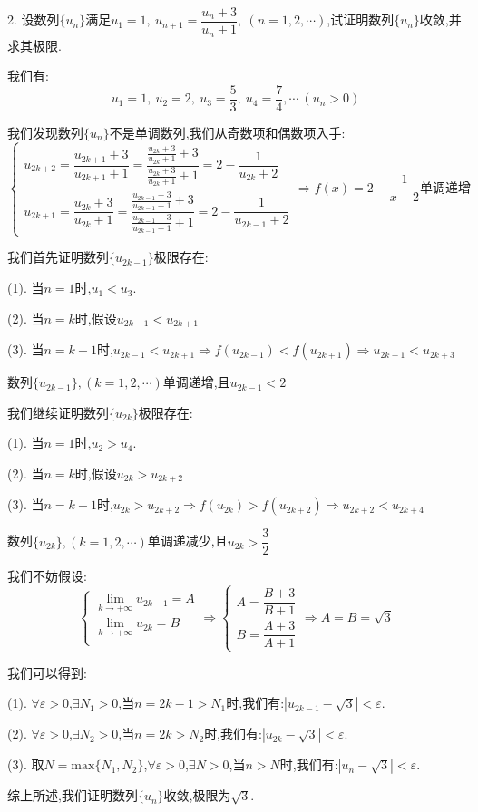 2. 设数列$\{u_{n}\}$满足$u_{1}=1,\ u_{n+1}=\dfrac{u_{n}+3}{u_{n}+1},\ (n=1,2,\cdots)$,试证明数列$\{u_{n}\}$收敛,并求其极限.
\begin{solution}

	我们有:
	$$u_{1}=1,\ u_{2}=2,\ u_{3}=\dfrac{5}{3},\ u_{4}=\dfrac{7}{4},\cdots\ (u_{n}>0)$$
	
	我们发现数列$\{u_{n}\}$不是单调数列,我们从奇数项和偶数项入手:
	$$\left\lbrace
	\begin{array}{l}
		u_{2k+2}=\dfrac{u_{2k+1}+3}{u_{2k+1}+1}=\dfrac{\frac{u_{2k}+3}{u_{2k}+1}+3}{\frac{u_{2k}+3}{u_{2k}+1}+1}=2-\dfrac{1}{u_{2k}+2}\\
		u_{2k+1}=\dfrac{u_{2k}+3}{u_{2k}+1}=\dfrac{\frac{u_{2k-1}+3}{u_{2k-1}+1}+3}{\frac{u_{2k-1}+3}{u_{2k-1}+1}+1}=2-\dfrac{1}{u_{2k-1}+2}
	\end{array}
	\right. \Rightarrow f(x)=2-\dfrac{1}{x+2}\text{单调递增}$$
	
	我们首先证明数列$\{u_{2k-1}\}$极限存在:  
	
	(1). 当$n=1$时,$u_{1}<u_{3}$.
	
	(2). 当$n=k$时,假设$u_{2k-1}<u_{2k+1}$
	
	(3). 当$n=k+1$时,$u_{2k-1}<u_{2k+1}\Rightarrow f(u_{2k-1})<f(u_{2k+1})\Rightarrow u_{2k+1}<u_{2k+3}$
	
	数列$\{u_{2k-1}\},(k=1,2,\cdots)$单调递增,且$u_{2k-1}<2$
	
	我们继续证明数列$\{u_{2k}\}$极限存在:  
	
	(1). 当$n=1$时,$u_{2}>u_{4}$.
	
	(2). 当$n=k$时,假设$u_{2k}>u_{2k+2}$
	
	(3). 当$n=k+1$时,$u_{2k}>u_{2k+2}\Rightarrow f(u_{2k})>f(u_{2k+2})\Rightarrow u_{2k+2}<u_{2k+4}$
	
	数列$\{u_{2k}\},(k=1,2,\cdots)$单调递减少,且$u_{2k}>\dfrac{3}{2}$
	
	我们不妨假设:  $$\left\lbrace
	\begin{array}{l}
		\lim\limits_{k\rightarrow +\infty}u_{2k-1}=A\\
		\lim\limits_{k\rightarrow +\infty}u_{2k}=B\\
	\end{array}
	\right. \Rightarrow \left\lbrace
	\begin{array}{l}
		A=\dfrac{B+3}{B+1}\\
		B=\dfrac{A+3}{A+1}
	\end{array}
	\right. \Rightarrow A=B=\sqrt{3}$$
	
	我们可以得到:  
	
	(1). $\forall \varepsilon>0$,$\exists N_{1}>0$,当$n=2k-1>N_{1}$时,我们有:$|u_{2k-1}-\sqrt{3}|<\varepsilon$.
	
	(2). $\forall \varepsilon>0$,$\exists N_{2}>0$,当$n=2k>N_{2}$时,我们有:$|u_{2k}-\sqrt{3}|<\varepsilon$.
	
	(3). 取$N=\text{max}\{N_{1},N_{2}\}$,$\forall \varepsilon>0$,$\exists N>0$,当$n>N$时,我们有:$|u_{n}-\sqrt{3}|<\varepsilon$.
	
	综上所述,我们证明数列$\{u_{n}\}$收敛,极限为$\sqrt{3}$.
\end{solution}

